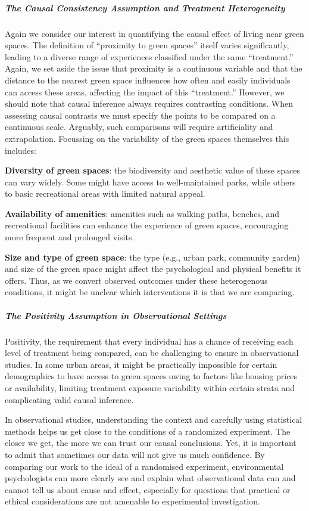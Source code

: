 \documentclass[
  singlecolumn]{article}
\let\oldsubparagraph\subparagraph
\renewcommand{\subparagraph}[1]{\oldsubparagraph{#1}\mbox{}}
\begin{document}
\subparagraph{The Causal Consistency Assumption and Treatment
Heterogeneity}\label{the-causal-consistency-assumption-and-treatment-heterogeneity}

Again we consider our interest in quantifying the causal effect of
living near green spaces. The definition of ``proximity to green
spaces'' itself varies significantly, leading to a diverse range of
experiences classified under the same ``treatment.'' Again, we set aside
the issue that proximity is a continuous variable and that the distance
to the nearest green space influences how often and easily individuals
can access these areas, affecting the impact of this ``treatment.''
However, we should note that causal inference always requires
contrasting conditions. When assessing causal contrasts we must specify
the points to be compared on a continuous scale. Arguably, such
comparisons will require artificiality and extrapolation. Focussing on
the variability of the green spaces themselves this includes:

\textbf{Diversity of green spaces}: the biodiversity and aesthetic value
of these spaces can vary widely. Some might have access to
well-maintained parks, while others to basic recreational areas with
limited natural appeal.

\textbf{Availability of amenities}: amenities such as walking paths,
benches, and recreational facilities can enhance the experience of green
spaces, encouraging more frequent and prolonged visits.

\textbf{Size and type of green space}: the type (e.g., urban park,
community garden) and size of the green space might affect the
psychological and physical benefits it offers. Thus, as we convert
observed outcomes under these heterogenous conditions, it might be
unclear which interventions it is that we are comparing.

\subparagraph{The Positivity Assumption in Observational
Settings}\label{the-positivity-assumption-in-observational-settings}

Positivity, the requirement that every individual has a chance of
receiving each level of treatment being compared, can be challenging to
ensure in observational studies. In some urban areas, it might be
practically impossible for certain demographics to have access to green
spaces owing to factors like housing prices or availability, limiting
treatment exposure variability within certain strata and complicating
valid causal inference.

In observational studies, understanding the context and carefully using
statistical methods helps us get close to the conditions of a randomized
experiment. The closer we get, the more we can trust our causal
conclusions. Yet, it is important to admit that sometimes our data will
not give us much confidence. By comparing our work to the ideal of a
randomised experiment, environmental psychologists can more clearly see
and explain what observational data can and cannot tell us about cause
and effect, especially for questions that practical or ethical
considerations are not amenable to experimental investigation.
\end{document}
